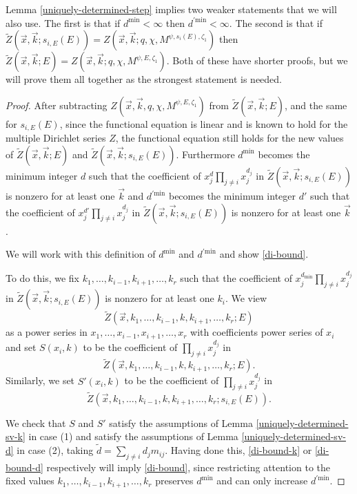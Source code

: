 \documentclass[11pt,letterpaper]{article}
\theoremstyle{definition}
\theoremstyle{remark}
\numberwithin{equation}{section}
\theoremstyle{dotless}
\newcommand{\hchi}{\psi} %
\newcommand{\gene}{\zeta_1} %
\renewcommand{\tilde}{\widetilde}
\begin{document}
Lemma \ref{uniquely-determined-step} implies two weaker statements that we will also use. The first is that if $d^{\mathrm{min}}<\infty$ then $d^{'\mathrm{min}}<\infty$. The second is that if $\tilde{Z} (\vec{x}, \vec{k}; s_{i,E}(E) ) =Z(\vec{x}, \vec{k} ;q, \chi, M^{\hchi,s_i(E),\gene})$ then $\tilde{Z} (\vec{x}, \vec{k}; E) = Z(\vec{x}, \vec{k}; q, \chi, M^{\hchi,E,\gene})$. Both of these have shorter proofs, but we will prove them all together as the strongest statement is needed.

\begin{proof} After subtracting  $Z(\vec{x}, \vec{k} , q, \chi, M^{\hchi,E,\gene})$ from $\tilde{Z} (\vec{x}, \vec{k}; E) $, and the same for $s_{i,E}(E)$, since the functional equation is linear and is known to hold for the multiple Dirichlet series $Z$, the functional equation still holds for the new values of $\tilde{Z} (\vec{x}, \vec{k}; E) $ and $\tilde{Z} (\vec{x}, \vec{k}; s_{i,E}(E))$. Furthermore $d^{\mathrm{min}}$ becomes the minimum integer $d$ such that the coefficient of $x_j^d \prod_{j \neq i}  x_j^{d_j}$ in $\tilde{Z} (\vec{x}, \vec{k}; s_{i,E}(E) ) $ is nonzero for at least one $\vec{k}$ and $d^{'\mathrm{min}}$ becomes the minimum integer $d'$ such that the coefficient of $x_j^{d'} \prod_{j \neq i}  x_j^{d_j}$ in $\tilde{Z} (\vec{x}, \vec{k}; s_{i,E}(E) ) $ is nonzero for at least one $\vec{k}$. 

We will work with this definition of $d^{\mathrm{min}}$ and $d^{'\mathrm{min}}$ and show \eqref{di-bound}.

To do this, we fix $k_1,\dots, k_{i-1}, k_{i+1},\dots, k_r$ such that the coefficient of $x_j^{d_{\mathrm{min}}} \prod_{j \neq i}  x_j^{d_j}$ in $\tilde{Z} (\vec{x},\vec{k}; s_{i,E}(E) ) $ is nonzero for at least one $k_i$. We view \[ \tilde{Z} (\vec{x}, k_1,\dots,k_{i-1},k,k_{i+1},\dots, k_r ; E) \] as a power series in $x_1,\dots,x_{i-1} ,x_{i+1},\dots,x_r$ with coefficients power series of $x_i$ and set $S(x_i, k)$ to be the coefficient of $ \prod_{j \neq i}  x_j^{d_j}$ in \[\tilde{Z} (\vec{x}, k_1,\dots,k_{i-1},k,k_{i+1},\dots, k_r ; E).\] Similarly, we set $S'(x_i,k)$ to be the coefficient of $ \prod_{j \neq i}  x_j^{d_j}$ in \[ \tilde{Z} (\vec{x}, k_1,\dots,k_{i-1},k,k_{i+1},\dots, k_r ; s_{i,E}(E) ).\]

We check that $S$ and $S'$ satisfy the assumptions of Lemma \ref{uniquely-determined-sv-k} in case (1) and satisfy the assumptions of Lemma \ref{uniquely-determined-sv-d} in case (2), taking $\tilde{d} = \sum_{j\neq i }  d_j m_{ij}$. Having done this, \eqref{di-bound-k} or \eqref{di-bound-d} respectively will imply  \eqref{di-bound}, since restricting attention to the fixed values $k_1,\dots, k_{i-1}, k_{i+1},\dots, k_r$ preserves $d^{\mathrm{min}}$ and can only increase $d^{'\mathrm{min}}$. 


\end{proof}
\end{document}
